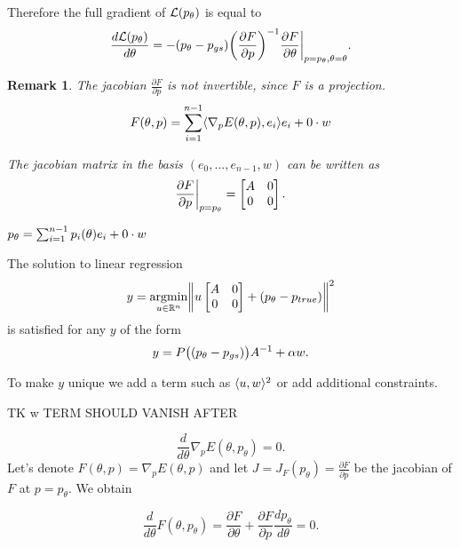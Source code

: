 \documentclass[a4paper,10pt]{report}
\newtheorem{remark}{Remark}
\begin{document}
Therefore the full gradient of $\mathcal{L}(p_\theta)$ is equal to
\begin{equation}
 \frac{d\mathcal{L}(p_\theta)}{d \theta} = - (p_\theta - p_{gs})\bigg(\frac{\partial F}{\partial p}\bigg)^{-1}  \frac{\partial F}{\partial \theta}\bigg|_{p=p_\theta, \theta=\theta}.
\end{equation}
\begin{remark}
 The jacobian $\frac{\partial F}{\partial p}$ is not invertible, since $F$ is a projection.
 \begin{equation}
  F(\theta, p) = \sum_{i=1}^{n-1} \langle \nabla_p E(\theta, p), e_i \rangle e_i +  0 \cdot w
 \end{equation}

 The jacobian matrix in the basis $(e_0,...,e_{n-1},w)$ can be written as \begin{equation}
                      \frac{\partial F}{\partial p}\bigg|_{p=p_\theta} =\begin{bmatrix}
A & 0 \\
0 & 0
\end{bmatrix}.
                     \end{equation}



 $p_\theta = \sum_{i=1}^{n-1}p_i(\theta) e_i +  0 \cdot w$
\end{remark}

The solution to linear regression
\begin{equation}
 y = \underset{u\in \mathbb{R}^n}{\mathrm{argmin }}\bigg\|u \begin{bmatrix}
A & 0 \\
0 & 0
\end{bmatrix} + (p_\theta-p_{true})\bigg\|^2
\end{equation}
is satisfied for any $y$ of the form
\begin{equation}
 y = P\big((p_\theta-p_{gs})\big)A^{-1} + \alpha w.
\end{equation}

To make $y$ unique we add a term such as $\langle u, w \rangle^2$ or add additional constraints.

TK w TERM SHOULD VANISH AFTER

$$ \frac{d}{d\theta} \nabla_p E(\theta,p_\theta) = 0.$$
 Let's denote $F(\theta,p) = \nabla_p E(\theta,p)$ and let $J = J_{F}(p_\theta)=\frac{\partial F}{\partial p}$ be the jacobian of $F$ at $p = p_\theta$.
We obtain

$$\frac{d}{d\theta}F(\theta,p_\theta) = \frac{\partial F}{\partial \theta} + \frac{\partial F}{\partial p}\frac{d p_\theta}{d\theta}= 0 .$$
\end{document}
